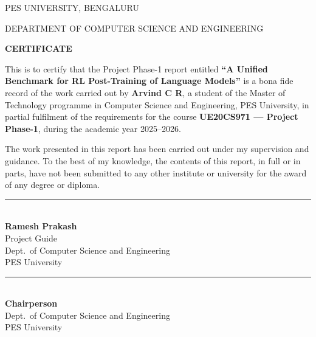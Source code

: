 \documentclass[12pt,a4paper]{report}
\begin{document}
\thispagestyle{empty}
\begin{center}
{\large PES UNIVERSITY, BENGALURU\par}
{\normalsize DEPARTMENT OF COMPUTER SCIENCE AND ENGINEERING\par}
\vspace{1.0em}
{\Large\bfseries CERTIFICATE\par}
\end{center}
\vspace{1.0em}

This is to certify that the Project Phase-1 report entitled
\textbf{``A Unified Benchmark for RL Post-Training of Language Models''}
is a bona fide record of the work carried out by \textbf{Arvind C R},
a student of the Master of Technology programme in Computer Science and
Engineering, PES University, in partial fulfilment of the requirements for the
course \textbf{UE20CS971 --- Project Phase-1}, during the academic year 2025--2026.

\vspace{0.6em}

The work presented in this report has been carried out under my supervision and
guidance. To the best of my knowledge, the contents of this report, in full or
in parts, have not been submitted to any other institute or university for the
award of any degree or diploma.

\vspace{3.0em}

\noindent
\begin{minipage}[t]{0.48\linewidth}
\centering
\rule{5cm}{0.4pt}\\
\textbf{Ramesh Prakash}\\
Project Guide\\
Dept.\ of Computer Science and Engineering\\
PES University
\end{minipage}
\hfill
\begin{minipage}[t]{0.48\linewidth}
\centering
\rule{5cm}{0.4pt}\\
\textbf{Chairperson}\\
Dept.\ of Computer Science and Engineering\\
PES University
\end{minipage}

\vspace{3.0em}
\end{document}
